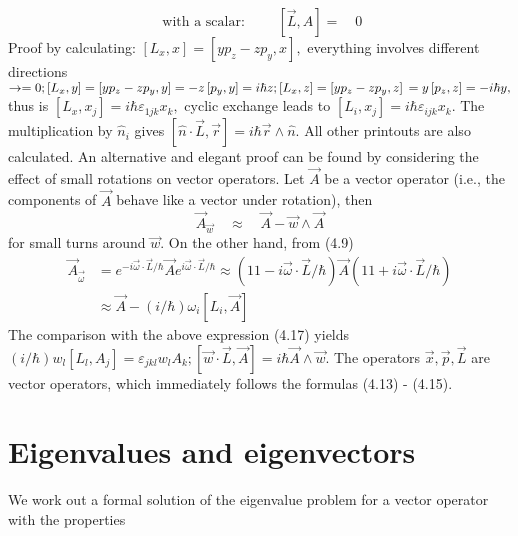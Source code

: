 \begin{equation}
        \text{ with a scalar: } \qquad \left[\vec{L}, A \right] = \quad 0
\end{equation}
Proof by calculating: $\left[L_{x}, x\right]=\left[y p_{z}-z p_{y}, x\right],$ everything involves different directions $\rightarrow=0 ;\left[L_{x}, y\right]=\left[y p_{z}-z p_{y}, y\right]=-z\left[p_{y}, y\right]=i \hbar z ;\left[L_{x}, z\right]=\left[y p_{z}-z p_{y}, z\right]\\=y\left[p_{z}, z\right]=-i \hbar y,$ thus is $\left[L_{x}, x_{j}\right]=i \hbar \varepsilon_{1 j k} x_{k},$ cyclic exchange leads to $\left[L_{i}, x_{j}\right]=i \hbar \varepsilon_{i j k} x_{k} .$ The multiplication by $\hat{n}_{i}$ gives $[\hat{n} \cdot \vec{L}, \vec{r}]=i \hbar \vec{r} \wedge \hat{n} .$ All other printouts are also calculated.
An alternative and elegant proof can be found by considering the effect of small rotations on vector operators. Let $\vec{A}$ be a vector operator (i.e., the components of $\vec{A}$ behave like a vector under rotation), then
\begin{equation}
    \vec{A}_{\vec{w}} \quad \approx \quad \vec{A} - \vec{w}\wedge \vec{A}
\end{equation}
for small turns around $\vec{w}$. On the other hand, from (4.9)
\begin{equation}
\begin{aligned} \vec{A}_{\vec{\omega}} &=e^{-i \vec{\omega} \cdot \vec{L} / \hbar} \vec{A} e^{i \vec{\omega} \cdot \vec{L} / \hbar} \approx(11-i \vec{\omega} \cdot \vec{L} / \hbar) \vec{A}(11+i \vec{\omega} \cdot \vec{L} / \hbar) \\ & \approx \vec{A}-(i / \hbar) \omega_{i}\left[L_{i}, \vec{A}\right] \end{aligned}
\end{equation}
The comparison with the above expression (4.17) yields $(i/\hbar)w_l[L_l,A_j]=\varepsilon_{jkl}w_lA_k; [\vec{w}\cdot\vec{L},\vec{A}]=i\hbar\vec{A}\wedge\vec{w}$. The operators $\vec{x},\vec{p},\vec{L}$ are vector operators, which immediately follows the formulas (4.13) - (4.15).

\section{Eigenvalues ​​and eigenvectors}
We work out a formal solution of the eigenvalue problem for a vector operator with the properties

